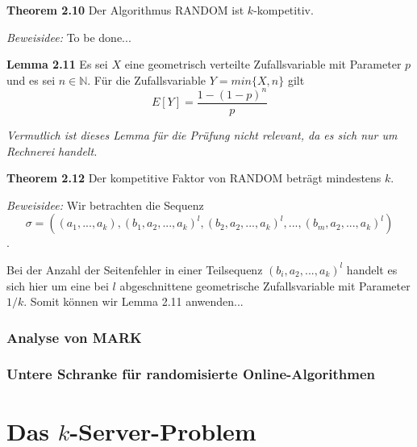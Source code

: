 \documentclass[a4paper]{report}
\begin{document}
\textbf{Theorem 2.10} Der Algorithmus RANDOM ist $k$-kompetitiv.

\textit{Beweisidee:} To be done...



\textbf{Lemma 2.11} Es sei $X$ eine geometrisch verteilte Zufallsvariable mit Parameter $p$ und es sei $n \in \mathbb{N}$. Für die Zufallsvariable $Y = min\{X,n\}$ gilt $$E[Y] = \frac{1-(1-p)^n}{p}$$

\textit{Vermutlich ist dieses Lemma für die Prüfung nicht relevant, da es sich nur um Rechnerei handelt.}



\textbf{Theorem 2.12} Der kompetitive Faktor von RANDOM beträgt mindestens $k$.

\textit{Beweisidee:} Wir betrachten die Sequenz $$\sigma = \left((a_1,...,a_k),(b_1,a_2,...,a_k)^l,(b_2,a_2,...,a_k)^l,...,(b_m,a_2,...,a_k)^l\right)$$.

Bei der Anzahl der Seitenfehler in einer Teilsequenz $(b_i,a_2,...,a_k)^l$ handelt es sich hier um eine bei $l$ abgeschnittene geometrische Zufallsvariable mit Parameter $1/k$. Somit können wir Lemma 2.11 anwenden...


\subsection{Analyse von MARK}

\subsection{Untere Schranke für randomisierte Online-Algorithmen}

\chapter{Das $k$-Server-Problem}
\end{document}

